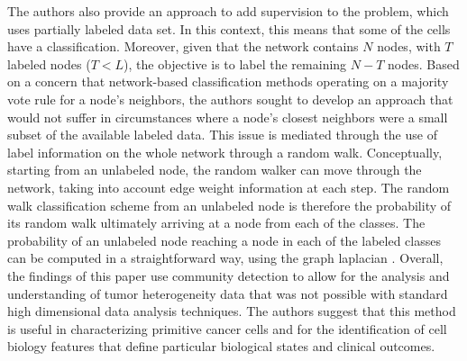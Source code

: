 \indent The authors also provide an approach to add supervision to the problem, which uses partially labeled data set. In this context, this means that some of the cells have a classification. Moreover, given that the network contains $N$ nodes, with $T$ labeled nodes ($T<L$), the objective is to label the remaining $N-T$ nodes. Based on a concern that network-based classification methods operating on a majority vote rule for a node's neighbors, the authors sought to develop an approach that would not suffer in circumstances where a node's closest neighbors were a small subset of the available labeled data. This issue is mediated through the use of label information on the whole network through a random walk. Conceptually, starting from an unlabeled node, the random walker can move through the network, taking into account edge weight information at each step. The random walk classification scheme from an unlabeled node is therefore the probability of its random walk ultimately arriving at a node from each of the classes.  The probability of an unlabeled node reaching a node in each of the labeled classes can be computed in a straightforward way, using the graph laplacian \cite{RWR}.
\indent Overall, the findings of this paper use community detection to allow for the analysis and understanding of tumor heterogeneity data that was not possible with standard high dimensional data analysis techniques.  The authors suggest that this method is useful in characterizing primitive cancer cells and for the identification of cell biology features that define particular biological states and clinical outcomes. 

